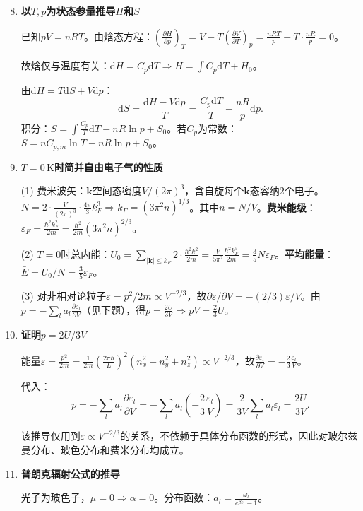 \documentclass[12pt,a4paper,fontset=mac]{ctexart}
\newcommand{\kk}{\mathbf{k}}
\newcommand{\dd}{\mathrm{d}}
\newcommand{\đ}{\mathrm{đ}}
\begin{document}
\begin{enumerate}
\setcounter{enumi}{7}

\item \textbf{以$T,p$为状态参量推导$H$和$S$}

已知$pV=nRT$。由焓态方程：$\left(\frac{\partial H}{\partial p}\right)_T=V-T\left(\frac{\partial V}{\partial T}\right)_p=\frac{nRT}{p}-T\cdot\frac{nR}{p}=0$。

故焓仅与温度有关：$\dd H=C_p\dd T\Rightarrow H=\int C_p\dd T+H_0$。

由$\dd H=T\dd S+V\dd p$：
\[\dd S=\frac{\dd H-V\dd p}{T}=\frac{C_p\dd T}{T}-\frac{nR}{p}\dd p.\]
积分：$S=\int\frac{C_p}{T}\dd T-nR\ln p+S_0$。若$C_p$为常数：$S=nC_{p,m}\ln T-nR\ln p+S_0$。

\item \textbf{$T=0\,\text{K}$时简并自由电子气的性质}

(1) 费米波矢：$\kk$空间态密度$V/(2\pi)^3$，含自旋每个$\kk$态容纳2个电子。$N=2\cdot\frac{V}{(2\pi)^3}\cdot\frac{4\pi}{3}k_F^3\Rightarrow k_F=(3\pi^2n)^{1/3}$。其中$n=N/V$。\textbf{费米能级}：$\varepsilon_F=\frac{\hbar^2k_F^2}{2m}=\frac{\hbar^2}{2m}(3\pi^2n)^{2/3}$。

(2) $T=0$时总内能：$U_0=\sum_{|\kk|\le k_F}2\cdot\frac{\hbar^2k^2}{2m}=\frac{V}{5\pi^2}\frac{\hbar^2k_F^5}{2m}=\frac{3}{5}N\varepsilon_F$。\textbf{平均能量}：$\bar{E}=U_0/N=\frac{3}{5}\varepsilon_F$。

(3) 对非相对论粒子$\varepsilon=p^2/2m\propto V^{-2/3}$，故$\partial\varepsilon/\partial V=-(2/3)\varepsilon/V$。由$p=-\sum_la_l\frac{\partial\varepsilon_l}{\partial V}$（见下题），得$p=\frac{2U}{3V}\Rightarrow pV=\frac{2}{3}U$。

\item \textbf{证明$p=2U/3V$}

能量$\varepsilon=\frac{p^2}{2m}=\frac{1}{2m}(\frac{2\pi\hbar}{L})^2(n_x^2+n_y^2+n_z^2)\propto V^{-2/3}$，故$\frac{\partial\varepsilon_l}{\partial V}=-\frac{2}{3}\frac{\varepsilon_l}{V}$。

代入：
\[p=-\sum_la_l\frac{\partial\varepsilon_l}{\partial V}=-\sum_la_l\left(-\frac{2}{3}\frac{\varepsilon_l}{V}\right)=\frac{2}{3V}\sum_la_l\varepsilon_l=\frac{2U}{3V}.\]

该推导仅用到$\varepsilon\propto V^{-2/3}$的关系，不依赖于具体分布函数的形式，因此对玻尔兹曼分布、玻色分布和费米分布均成立。

\item \textbf{普朗克辐射公式的推导}

光子为玻色子，$\mu=0\Rightarrow\alpha=0$。分布函数：$a_l=\frac{\omega_l}{e^{\beta\varepsilon_l}-1}$。


\end{enumerate}
\end{document}
